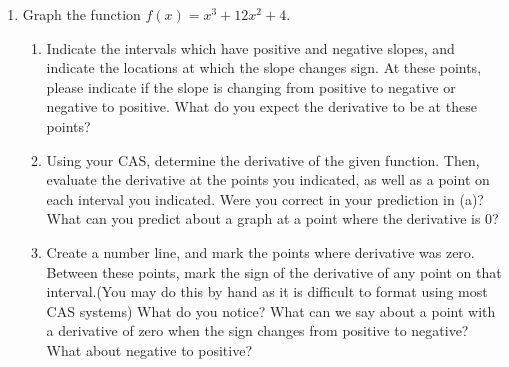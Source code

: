 \documentclass{ximera}
\begin{document}
\begin{enumerate}
\item{Graph the function $f(x)=x^3+12x^2+4$.}
\begin{enumerate}
\item{Indicate the intervals which have positive and negative slopes, and indicate the locations at which the slope changes sign. At these points, please indicate if the slope is changing from positive to negative or negative to positive. What do you expect the derivative to be at these points?}
\item{Using your CAS, determine the derivative of the given function. Then, evaluate the derivative at the points you indicated, as well as a point on each interval you indicated. Were you correct in your prediction in (a)? What can you predict about a graph at a point where the derivative is 0?}
\item{Create a number line, and mark the points where derivative was zero. Between these points, mark the sign of the derivative of any point on that interval.(You may do this by hand as it is difficult to format using most CAS systems) What do you notice? What can we say about a point with a derivative of zero when the sign changes from positive to negative? What about negative to positive?}
\end{enumerate}



\begin{image}
\end{image}




\end{enumerate}
\end{document}
